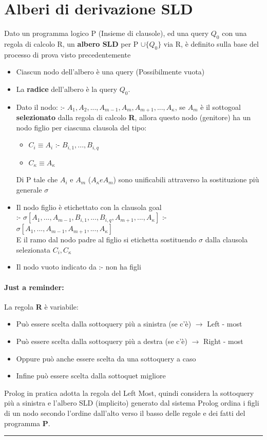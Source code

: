 \documentclass[12pt, a4paper, openany, oneside]{book}
\begin{document}
\section{Alberi di derivazione SLD}
Dato un programma logico P (Insieme di clausole), ed una query $Q_{0}$ con una 
regola di calcolo R, un \textbf{albero SLD} per P $\cup \{Q_{0}\}$ via R, è 
definito sulla base del processo di prova visto precedentemente
\begin{itemize}
	\item Ciascun nodo dell'albero è una query (Possibilmente vuota)
	\item La \textbf{radice} dell'albero è la query $Q_{0}$.
	\item Dato il nodo: :- $A_{1}, A_{2}, ..., A_{m-1}, A_{m}, A_{m+1}, ...,
	A_{\kappa}$, se $A_{m}$ è il sottogoal \textbf{selezionato} dalla regola di
	calcolo \textbf{R}, allora questo nodo (genitore) ha un nodo figlio per 
	ciascuna clausola del tipo: \\
	\begin{itemize}
		\item $C_{i} \equiv A_{i}$ :- $B_{i,1}, ..., B_{i,q}$
		\item $C_{\kappa} \equiv A_{\kappa}$
	\end{itemize}
	Di P tale che $A_{i}$ e $A_{m}$ ($A_{\kappa} e A_{m}$) sono unificabili 
	attraverso la sostituzione più generale $\sigma$
	\item Il nodo figlio è etichettato con la clausola goal \\
	:- $\sigma[A_{1}, ..., A_{m-1}, B_{i,1}, ..., B_{i,q}, A_{m+1}, ..., A_{\kappa}]$
	:- $\sigma[A_{1}, ..., A_{m-1}, A_{m+1}, ..., A_{\kappa}]$ \\
	E il ramo dal nodo padre al figlio si etichetta sostituendo $\sigma$ dalla
	clausola selezionata $C_{i}, C_{\kappa}$
	\item Il nodo vuoto indicato da :- non ha figli
\end{itemize}
\paragraph{Just a reminder: }La regola \textbf{R} è variabile:
\begin{itemize}
	\item Può essere scelta dalla sottoquery più a sinistra (se c'è) $\to$ Left - most
	\item Può essere scelta dalla sottoquery più a destra (se c'è) $\to$ Right - most
	\item Oppure può anche essere scelta da una sottoquery a caso
	\item Infine può essere scelta dalla sottoquet migliore
\end{itemize}
Prolog in pratica adotta la regola del Left Most, quindi considera la sottoquery
più a sinistra e l'albero SLD (implicito) generato dal sistema Prolog ordina i 
figli di un nodo secondo l'ordine dall'alto verso il basso delle regole e dei 
fatti del programma \textbf{P}.
\\
{\color{black} \rule{\linewidth}{0.3mm} }
\\
\end{document}
